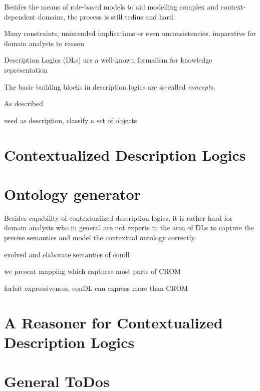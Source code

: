 Besides the means of role-based models to aid modelling complex and context-dependent
domains, the process is still tedius and hard. 

Many constraints, unintended implications or even unconsistencies. imparative for domain analysts to reason


Description Logics (DLs) are a well-known formalism for knowledge representation



The basic building blocks in description logics are so-called \emph{concepts}. 

As described

used as description, classify a set of objects

\section{Contextualized Description Logics}
\label{sec:intro-contextualized-description-logics}

\blindtext

\section{Ontology generator}
\label{sec:zweite-section}

Besides capability of contextualized description logics, it is rather hard for domain analysts who
in general are not experts in the area of DLs to capture the precise semantics and model the
contextual ontology correctly. 

evolved and elaborate semantics of condl

we present mapping which captures most parts of CROM

forfeit expressiveness, conDL can express more than CROM


\blindtext 


\section{A Reasoner for Contextualized Description Logics}
\label{sec:intro-reasoner}


\blindtext




\clearpage

\section{General ToDos}
\label{sec:todos}





